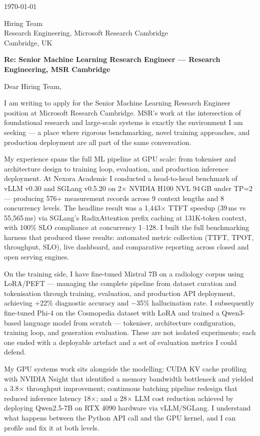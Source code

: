 \documentclass[11pt,a4paper]{moderncv}
\begin{document}
\makecvtitle

\today

\vspace{1em}
Hiring Team\\
Research Engineering, Microsoft Research Cambridge\\
Cambridge, UK

\vspace{1em}
\textbf{Re: Senior Machine Learning Research Engineer — Research Engineering, MSR Cambridge}

\vspace{1em}
Dear Hiring Team,

I am writing to apply for the Senior Machine Learning Research Engineer position at Microsoft Research Cambridge. MSR's work at the intersection of foundational research and large-scale systems is exactly the environment I am seeking — a place where rigorous benchmarking, novel training approaches, and production deployment are all part of the same conversation.

My experience spans the full ML pipeline at GPU scale: from tokeniser and architecture design to training loop, evaluation, and production inference deployment. At Nexora Academic I conducted a head-to-head benchmark of vLLM v0.30 and SGLang v0.5.20 on 2$\times$ NVIDIA H100 NVL 94\,GB under TP=2 — producing 576+ measurement records across 9 context lengths and 8 concurrency levels. The headline result was a 1,443$\times$ TTFT speedup (39\,ms vs 55,565\,ms) via SGLang's RadixAttention prefix caching at 131K-token context, with 100\% SLO compliance at concurrency 1--128. I built the full benchmarking harness that produced these results: automated metric collection (TTFT, TPOT, throughput, SLO), live dashboard, and comparative reporting across closed and open serving engines.

On the training side, I have fine-tuned Mistral 7B on a radiology corpus using LoRA/PEFT — managing the complete pipeline from dataset curation and tokenisation through training, evaluation, and production API deployment, achieving +22\% diagnostic accuracy and $-$35\% hallucination rate. I subsequently fine-tuned Phi-4 on the Cosmopedia dataset with LoRA and trained a Qwen3-based language model from scratch — tokeniser, architecture configuration, training loop, and generation evaluation. These are not isolated experiments; each one ended with a deployable artefact and a set of evaluation metrics I could defend.

My GPU systems work sits alongside the modelling: CUDA KV cache profiling with NVIDIA Nsight that identified a memory bandwidth bottleneck and yielded a 3.8$\times$ throughput improvement; continuous batching pipeline redesign that reduced inference latency 18$\times$; and a 28$\times$ LLM cost reduction achieved by deploying Qwen2.5-7B on RTX 4090 hardware via vLLM/SGLang. I understand what happens between the Python API call and the GPU kernel, and I can profile and fix it at both levels.
\end{document}
